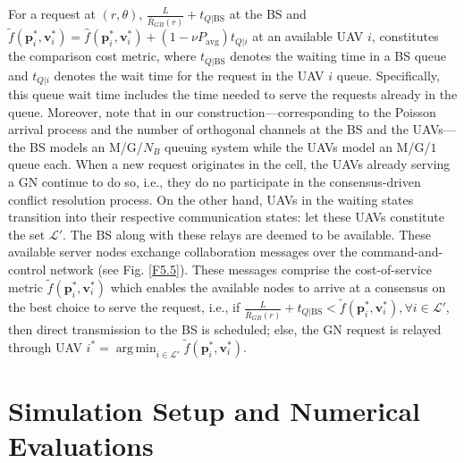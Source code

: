 \documentclass[12pt, draftcls, onecolumn]{IEEEtran}
\theoremstyle{plain}
\theoremstyle{definition}
\theoremstyle{remark}
\DeclareMathOperator*{\argmin}{arg\,min}
\begin{document}
For a request at $(r,\theta)$, $\frac{L}{\bar{R}_{GB}(r)}{+}t_{Q|\text{BS}}$ at the BS and $\tilde{f}(\mathbf{p}_{i}^{*},\mathbf{v}_{i}^{*}){=}\hat{f}(\mathbf{p}_{i}^{*},\mathbf{v}_{i}^{*}){+}(1{-}\nu P_{\mathrm{avg}})t_{Q|i}$ at an available UAV $i$, constitutes the comparison cost metric, where $t_{Q|\text{BS}}$ denotes the waiting time in a BS queue and $t_{Q|i}$ denotes the wait time for the request in the UAV $i$ queue. Specifically, this queue wait time includes the time needed to serve the requests already in the queue. Moreover, note that in our construction---corresponding to the Poisson arrival process and the number of orthogonal channels at the BS and the UAVs---the BS models an M/G/$N_{B}$ queuing system while the UAVs model an M/G/$1$ queue each. When a new request originates in the cell, the UAVs already serving a GN continue to do so, i.e., they do no participate in the consensus-driven conflict resolution process. On the other hand, UAVs in the {waiting} states transition into their respective {communication} states: let these UAVs constitute the set $\mathcal{L}'$. The BS along with these relays are deemed to be available. These available server nodes exchange collaboration messages over the command-and-control network (see Fig. \ref{F5.5}). These messages comprise the cost-of-service metric $\tilde{f}(\mathbf{p}_{i}^{*},\mathbf{v}_{i}^{*})$ which enables the available nodes to arrive at a consensus on the best choice to serve the request, i.e., if $\frac{L}{\bar{R}_{GB}(r)}{+}t_{Q|\text{BS}}{<}\tilde{f}(\mathbf{p}_{i}^{*},\mathbf{v}_{i}^{*}),{\forall}i{\in}\mathcal{L}'$, then direct transmission to the BS is scheduled; else, the GN request is relayed through UAV $i^{*}{=}\argmin_{i{\in}\mathcal{L}'}\tilde{f}(\mathbf{p}_{i}^{*},\mathbf{v}_{i}^{*})$.
\vspace{-4mm}


\section{Simulation Setup and Numerical Evaluations}\label{S6}
\vspace{-2mm}
\end{document}
